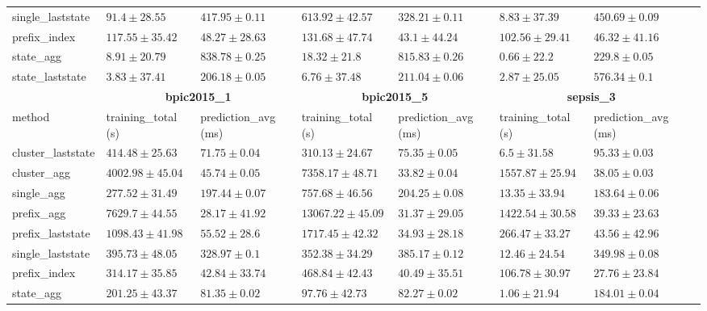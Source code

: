 \documentclass[twoside,11pt]{Latex/Classes/PhDthesisPSnPDF}
\begin{document}
\begin{table}[h]
{\begin{tabular}{llllllll}
			single\_laststate & $91.4 \pm 28.55$ & $417.95 \pm 0.11$ & $613.92 \pm 42.57$ & $328.21 \pm 0.11$ & $8.83 \pm 37.39$ & $450.69 \pm 0.09$ \\ 
			prefix\_index & $117.55 \pm 35.42$ & $48.27 \pm 28.63$ & $131.68 \pm 47.74$ & $43.1 \pm 44.24$ & $102.56 \pm 29.41$ & $46.32 \pm 41.16$ \\ 
			state\_agg & $8.91 \pm 20.79$ & $838.78 \pm 0.25$ & $18.32 \pm 21.8$ & $815.83 \pm 0.26$ & $\mathbf{0.66 \pm 22.2}$ & $229.8 \pm 0.05$ \\ 
			state\_laststate & $\mathbf{3.83 \pm 37.41}$ & $206.18 \pm 0.05$ & $\mathbf{6.76 \pm 37.48}$ & $211.04 \pm 0.06$ & $2.87 \pm 25.05$ & $576.34 \pm 0.1$ \\ 
			\bottomrule
			\toprule
			& \multicolumn{2}{c}{{\bfseries bpic2015\_1}} & \multicolumn{2}{c}{{\bfseries bpic2015\_5}} & \multicolumn{2}{c}{{\bfseries sepsis\_3}} \\ \cmidrule(lr){2-3} \cmidrule(lr){4-5} \cmidrule(lr){6-7}
			method  & training\_total (s) & prediction\_avg (ms) & training\_total (s) & prediction\_avg (ms) & training\_total (s) & prediction\_avg (ms) \\ \midrule
			cluster\_laststate & $414.48 \pm 25.63$ & $71.75 \pm 0.04$ & $310.13 \pm 24.67$ & $75.35 \pm 0.05$ & $6.5 \pm 31.58$ & $95.33 \pm 0.03$ \\ 
			cluster\_agg & $4002.98 \pm 45.04$ & $45.74 \pm 0.05$ & $7358.17 \pm 48.71$ & $33.82 \pm 0.04$ & $1557.87 \pm 25.94$ & $38.05 \pm 0.03$ \\ 
			single\_agg & $277.52 \pm 31.49$ & $197.44 \pm 0.07$ & $757.68 \pm 46.56$ & $204.25 \pm 0.08$ & $13.35 \pm 33.94$ & $183.64 \pm 0.06$ \\ 
			prefix\_agg & $7629.7 \pm 44.55$ & $\mathbf{28.17 \pm 41.92}$ & $13067.22 \pm 45.09$ & $\mathbf{31.37 \pm 29.05}$ & $1422.54 \pm 30.58$ & $39.33 \pm 23.63$ \\ 
			prefix\_laststate & $1098.43 \pm 41.98$ & $55.52 \pm 28.6$ & $1717.45 \pm 42.32$ & $34.93 \pm 28.18$ & $266.47 \pm 33.27$ & $43.56 \pm 42.96$ \\ 
			single\_laststate & $395.73 \pm 48.05$ & $328.97 \pm 0.1$ & $352.38 \pm 34.29$ & $385.17 \pm 0.12$ & $12.46 \pm 24.54$ & $349.98 \pm 0.08$ \\ 
			prefix\_index & $314.17 \pm 35.85$ & $42.84 \pm 33.74$ & $468.84 \pm 42.43$ & $40.49 \pm 35.51$ & $106.78 \pm 30.97$ & $\mathbf{27.76 \pm 23.84}$ \\ 
			state\_agg & $\mathbf{201.25 \pm 43.37}$ & $81.35 \pm 0.02$ & $\mathbf{97.76 \pm 42.73}$ & $82.27 \pm 0.02$ & $\mathbf{1.06 \pm 21.94}$ & $184.01 \pm 0.04$ \\ 

\end{tabular}}
\end{table}
\end{document}
